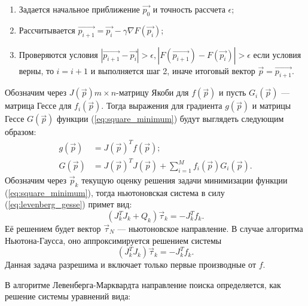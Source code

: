 \begin{enumerate}
 \item Задается начальное приближение $\vec{p_0}$ и точность рассчета $\epsilon$;
 \item Рассчитывается $ \vec{p_{i+1}} =  \vec{p_{i}} - \gamma \nabla F(\vec{p_{i}}) $;
 \item Проверяются условия $\left| \vec{p_{i+1}} - \vec{p_{i}} \right| > \epsilon, \left| F(\vec{p_{i+1}}) - F(\vec{p_{i}}) \right| > \epsilon $ если условия верны, то $i = i + 1$ 
 и выполняется шаг 2, иначе итоговый вектор $ \vec{p} = \vec{p_{i+1}} $.
\end{enumerate}
Обозначим через $J(\vec{p}) m \times n$-матрицу Якоби для $f(\vec{p})$ и пусть $G_i(\vec{p})$ --- 
матрица Гессе для $f_i(\vec{p})$. Тогда выражения для градиента $g(\vec{p})$ и матрицы Гессе $G(\vec{p})$ функции
(\ref{eq:square_minimum}) будут выглядеть следующим образом:
\begin{equation}
\begin{split}
 g(\vec{p}) &= J(\vec{p})^T f(\vec{p}); \\
 G(\vec{p}) &= J(\vec{p})^T J(\vec{p}) + \displaystyle \sum_{i=1}^M f_i(\vec{p}) G_i(\vec{p}).
\end{split}
 \label{eq:levenberg_gesse}
\end{equation}
Обозначим через $\vec{p}_k$ текущую оценку решения задачи минимизации функции (\ref{eq:square_minimum}),
тогда ньютоновская система в силу (\ref{eq:levenberg_gesse}) примет вид:
\begin{equation}
 \left(J^T_k J_k + Q_k\right) \vec{\tau}_k = -J^T_k f_k.
\end{equation}
Её решением будет вектор $\vec{\tau}_N$ --- ньютоновское направление. В случае алгоритма Ньютона-Гаусса, оно аппроксимируется  решением системы 
\begin{equation}
 (J^T_k J_k ) \vec{\tau}_k = -J^T_k f_k.
\end{equation}
Данная задача разрешима и включает только первые производные от $f$.

В алгоритме Левенберга-Марквардта направление поиска 
определяется, как решение системы уравнений вида:

